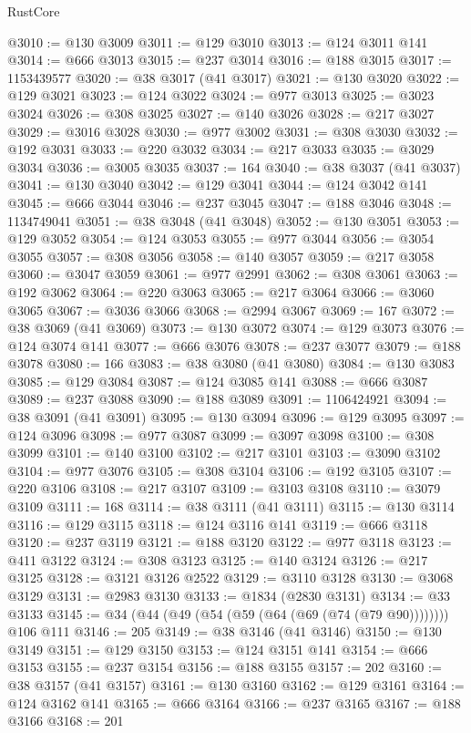 \begin{lexlean}{RustCore}
\begin{coremodule}
@3010 := @130 @3009
@3011 := @129 @3010
@3013 := @124 @3011 @141
@3014 := @666 @3013
@3015 := @237 @3014
@3016 := @188 @3015
@3017 := 1153439577
@3020 := @38 @3017 (@41 @3017)
@3021 := @130 @3020
@3022 := @129 @3021
@3023 := @124 @3022
@3024 := @977 @3013
@3025 := @3023 @3024
@3026 := @308 @3025
@3027 := @140 @3026
@3028 := @217 @3027
@3029 := @3016 @3028
@3030 := @977 @3002
@3031 := @308 @3030
@3032 := @192 @3031
@3033 := @220 @3032
@3034 := @217 @3033
@3035 := @3029 @3034
@3036 := @3005 @3035
@3037 := 164
@3040 := @38 @3037 (@41 @3037)
@3041 := @130 @3040
@3042 := @129 @3041
@3044 := @124 @3042 @141
@3045 := @666 @3044
@3046 := @237 @3045
@3047 := @188 @3046
@3048 := 1134749041
@3051 := @38 @3048 (@41 @3048)
@3052 := @130 @3051
@3053 := @129 @3052
@3054 := @124 @3053
@3055 := @977 @3044
@3056 := @3054 @3055
@3057 := @308 @3056
@3058 := @140 @3057
@3059 := @217 @3058
@3060 := @3047 @3059
@3061 := @977 @2991
@3062 := @308 @3061
@3063 := @192 @3062
@3064 := @220 @3063
@3065 := @217 @3064
@3066 := @3060 @3065
@3067 := @3036 @3066
@3068 := @2994 @3067
@3069 := 167
@3072 := @38 @3069 (@41 @3069)
@3073 := @130 @3072
@3074 := @129 @3073
@3076 := @124 @3074 @141
@3077 := @666 @3076
@3078 := @237 @3077
@3079 := @188 @3078
@3080 := 166
@3083 := @38 @3080 (@41 @3080)
@3084 := @130 @3083
@3085 := @129 @3084
@3087 := @124 @3085 @141
@3088 := @666 @3087
@3089 := @237 @3088
@3090 := @188 @3089
@3091 := 1106424921
@3094 := @38 @3091 (@41 @3091)
@3095 := @130 @3094
@3096 := @129 @3095
@3097 := @124 @3096
@3098 := @977 @3087
@3099 := @3097 @3098
@3100 := @308 @3099
@3101 := @140 @3100
@3102 := @217 @3101
@3103 := @3090 @3102
@3104 := @977 @3076
@3105 := @308 @3104
@3106 := @192 @3105
@3107 := @220 @3106
@3108 := @217 @3107
@3109 := @3103 @3108
@3110 := @3079 @3109
@3111 := 168
@3114 := @38 @3111 (@41 @3111)
@3115 := @130 @3114
@3116 := @129 @3115
@3118 := @124 @3116 @141
@3119 := @666 @3118
@3120 := @237 @3119
@3121 := @188 @3120
@3122 := @977 @3118
@3123 := @411 @3122
@3124 := @308 @3123
@3125 := @140 @3124
@3126 := @217 @3125
@3128 := @3121 @3126 @2522
@3129 := @3110 @3128
@3130 := @3068 @3129
@3131 := @2983 @3130
@3133 := @1834 (@2830 @3131)
@3134 := @33 @3133
@3145 := @34 (@44 (@49 (@54 (@59 (@64 (@69 (@74 (@79 @90)))))))) @106 @111
@3146 := 205
@3149 := @38 @3146 (@41 @3146)
@3150 := @130 @3149
@3151 := @129 @3150
@3153 := @124 @3151 @141
@3154 := @666 @3153
@3155 := @237 @3154
@3156 := @188 @3155
@3157 := 202
@3160 := @38 @3157 (@41 @3157)
@3161 := @130 @3160
@3162 := @129 @3161
@3164 := @124 @3162 @141
@3165 := @666 @3164
@3166 := @237 @3165
@3167 := @188 @3166
@3168 := 201

\end{coremodule}
\end{lexlean}
